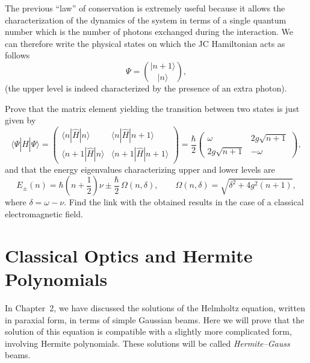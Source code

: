 The previous ``law'' of conservation is extremely useful because it
allows the characterization of the dynamics of the system in terms
of a single quantum number which is the number of photons
exchanged during the interaction. We can therefore write the
physical states on which the JC Hamiltonian acts as follows
\begin{equation}
\Psi=\binom{|n+1\rangle}{|n\rangle},
\label{eq:3.7.4}
\end{equation}
(the upper level is indeed characterized by the presence of an extra
photon).

\begin{exercise}
Prove that the matrix element yielding the transition between two
states is just given by
\begin{equation}
\langle\Psi|\hat H|\Psi\rangle=
\begin{pmatrix}
\langle n|\hat H|n\rangle & \langle n|\hat H|n+1\rangle\\[4pt]
\langle n+1|\hat H|n\rangle & \langle n+1|\hat H|n+1\rangle
\end{pmatrix}
=
\frac{\hbar}{2}
\begin{pmatrix}
\omega & 2g\sqrt{n+1}\\
2g\sqrt{n+1} & -\omega
\end{pmatrix},
\label{eq:3.7.5}
\end{equation}
and that the energy eigenvalues characterizing upper and lower
levels are
\begin{equation}
E_\pm(n)=\hbar\!\left(n+\frac{1}{2}\right)\nu
\pm\frac{\hbar}{2}\,\Omega(n,\delta),\qquad
\Omega(n,\delta)=\sqrt{\delta^2+4g^2(n+1)},
\label{eq:3.7.6}
\end{equation}
where $\delta=\omega-\nu$. Find the link with the obtained results
in the case of a classical electromagnetic field.
\end{exercise}

\section{Classical Optics and Hermite Polynomials}
\label{sec:3.8}

In Chapter~2, we have discussed the solutions of the Helmholtz
equation, written in paraxial form, in terms of simple Gaussian
beams. Here we will prove that the solution of this equation is
compatible with a slightly more complicated form, involving Hermite
polynomials. These solutions will be called \emph{Hermite--Gauss}
beams.

